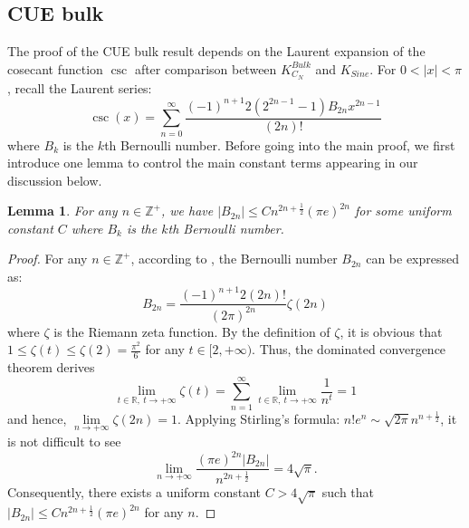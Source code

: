 \documentclass[11pt]{article}
\newtheorem{lemma}[theorem]{Lemma}
\numberwithin{equation}{section}%
\numberwithin{theorem}{section}
\begin{document}
\subsection{CUE bulk}\label{CUE bulk}
The proof of the CUE bulk result depends on the Laurent expansion of the cosecant function $\csc$ after comparison between $K_{C_N}^{Bulk}$ and $K_{Sine}$. For $0<|x|<\pi$, recall the Laurent series:
\begin{equation}\label{csc}
    \csc(x)=\sum_{n=0}^\infty\frac{(-1)^{n+1}2\left(2^{2n-1}-1\right)B_{2n}x^{2n-1}}{(2n)!}
\end{equation}
where $B_k$ is the $k$th Bernoulli number. Before going into the main proof, we first introduce one lemma to control the main constant terms appearing in our discussion below. 
\begin{lemma}\label{Bell}
    For any $n\in\mathbb{Z}^+$, we have $|B_{2n}|\le Cn^{2n+\frac{1}{2}}(\pi e)^{2n}$ for some uniform constant $C$ where $B_k$ is the $k$th Bernoulli number.
\end{lemma}
\begin{proof} For any $n\in\mathbb{Z}^+$, according to \cite[Corollary $4.12$]{arakawa_bernoulli_2014}, the Bernoulli number $B_{2n}$ can be expressed as:
    \begin{equation*}
        B_{2n}=\frac{(-1)^{n+1}2(2n)!}{(2\pi)^{2n}}\zeta(2n)
    \end{equation*}
    where $\zeta$ is the Riemann zeta function. By the definition of $\zeta$, it is obvious that $1\le\zeta(t)\le\zeta(2)=\frac{\pi^2}{6}$ for any $t\in[2,+\infty)$. Thus, the dominated convergence theorem derives
\begin{equation*}
\lim_{t\in\mathbb{R},~t\rightarrow+\infty}\zeta(t)=\sum_{n=1}^\infty\lim_{t\in\mathbb{R},~t\rightarrow+\infty}\frac{1}{n^t}=1
\end{equation*}
and hence, $\lim\limits_{n\rightarrow+\infty}\zeta(2n)=1$.
Applying Stirling's formula: $n!e^n\sim\sqrt{2\pi}n^{n+\frac{1}{2}}$, it is not difficult to see
    \begin{equation*}
    \lim_{n\rightarrow+\infty}\frac{(\pi e)^{2n}|B_{2n}|}{n^{2n+\frac{1}{2}}}=4\sqrt\pi.
    \end{equation*}
Consequently, there exists a uniform constant $C>4\sqrt\pi$ such that $|B_{2n}|\le C n^{2n+\frac{1}{2}}(\pi e)^{2n}$ for any $n$.
\end{proof}
\end{document}
